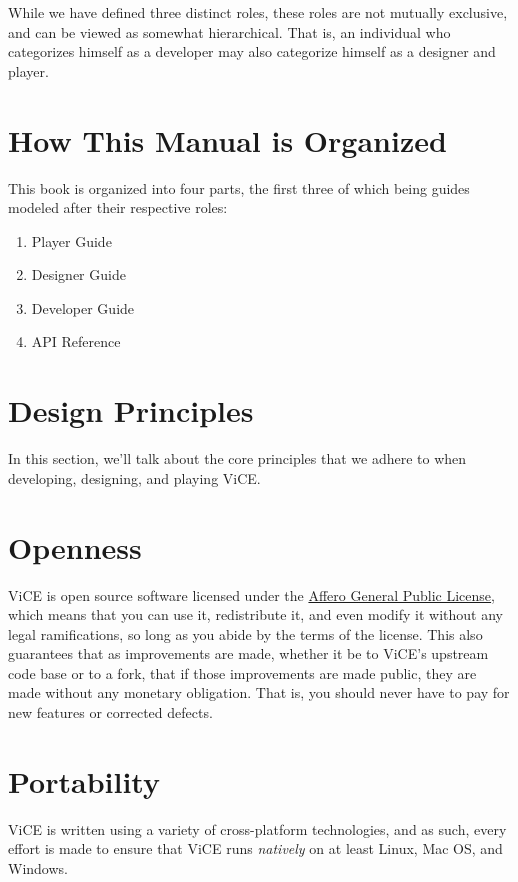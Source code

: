 \documentclass[letterpaper,10pt,english]{sphinxmanual}
\begin{document}
While we have defined three distinct roles, these roles are not mutually
exclusive, and can be viewed as somewhat hierarchical. That is, an individual
who categorizes himself as a developer may also categorize himself as a
designer and player.


\chapter{How This Manual is Organized}
\label{preface:how-this-manual-is-organized}
This book is organized into four parts, the first three of which being guides
modeled after their respective roles:
\begin{enumerate}
\item {} 
Player Guide

\item {} 
Designer Guide

\item {} 
Developer Guide

\item {} 
API Reference

\end{enumerate}


\chapter{Design Principles}
\label{preface:design-principles}
In this section, we'll talk about the core principles that we adhere to when
developing, designing, and playing ViCE.


\chapter{Openness}
\label{preface:openness}
ViCE is open source software licensed under
the \href{http://www.gnu.org/licenses/agpl-3.0.html}{Affero General Public License},
which means that you can use it, redistribute it, and even modify it without
any legal ramifications, so long as you abide by the terms of the license.
This also guarantees that as improvements are made, whether it be to
ViCE's upstream code base or to a fork, that
if those improvements are made public, they are made without any monetary
obligation. That is, you should never have to pay for new features or corrected defects.


\chapter{Portability}
\label{preface:portability}
ViCE is written using a variety of
cross-platform technologies, and as such, every effort is made to ensure that
ViCE runs \emph{natively} on at least Linux,
Mac OS, and Windows.
\end{document}
